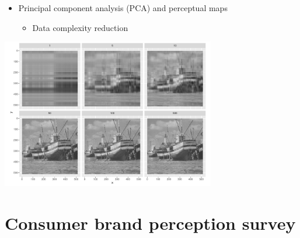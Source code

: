\documentclass[
  ignorenonframetext,
]{beamer}
\providecommand{\tightlist}{%
  \setlength{\itemsep}{0pt}\setlength{\parskip}{0pt}}\usepackage{longtable,booktabs,array}
\begin{document}
\begin{frame}{}
\label{section-27}
\begin{itemize}
\item
  Principal component analysis (PCA) and perceptual maps

  \begin{itemize}
  \tightlist
  \item
    Data complexity reduction
  \end{itemize}
\end{itemize}

\begin{center}
\includegraphics[width=0.7\textwidth,height=\textheight]{008_reducing_data_complexity_files/figure-beamer/unnamed-chunk-25-1.pdf}
\end{center}
\end{frame}

\section{Consumer brand perception
survey}\label{consumer-brand-perception-survey-1}
\end{document}

